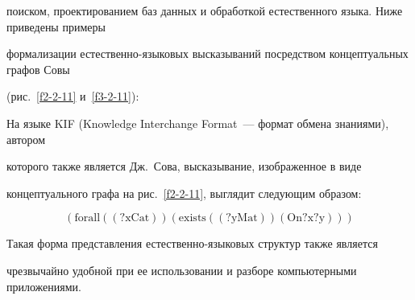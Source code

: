 поиском, проектированием баз данных и обработкой естественного языка. Ниже приведены примеры 


формализации естественно-языковых высказываний посредством концептуальных графов Совы 


(рис.~\ref{f2-2-11} и~\ref{f3-2-11}):


   





   На языке KIF (Knowledge Interchange Format~--- формат обмена знаниями), автором 


которого также является Дж.~Сова, высказывание, изображенное в виде 


концептуального графа на рис.~\ref{f2-2-11}, выглядит следующим образом:


$$


\mathrm{(forall ((?x Cat)) (exists ((?y Mat)) (On ?x ?y)))}


$$


   Такая форма представления естественно-языковых структур также является 


чрезвычайно удобной при ее использовании и разборе компьютерными приложениями.


